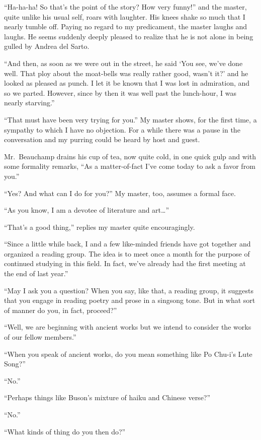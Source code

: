 \documentclass[12pt, openright]{book}
\begin{document}
``Ha-ha-ha! So that's the point of the story? How very funny!'' and the
master, quite unlike his usual self, roars with laughter. His knees
shake so much that I nearly tumble off. Paying no regard to my
predicament, the master laughs and laughs. He seems suddenly deeply
pleased to realize that he is not alone in being gulled by Andrea del
Sarto.

``And then, as soon as we were out in the street, he said `You see,
we've done well. That ploy about the moat-bells was really rather good,
wasn't it?' and he looked as pleased as punch. I let it be known that I
was lost in admiration, and so we parted. However, since by then it was
well past the lunch-hour, I was nearly starving.''

``That must have been very trying for you.'' My master shows, for the
first time, a sympathy to which I have no objection. For a while there
was a pause in the conversation and my purring could be heard by host
and guest.

Mr.~Beauchamp drains his cup of tea, now quite cold, in one quick gulp
and with some formality remarks, ``As a matter-of-fact I've come today
to ask a favor from you.''

``Yes? And what can I do for you?'' My master, too, assumes a formal
face.

``As you know, I am a devotee of literature and art\ldots{}''

``That's a good thing,'' replies my master quite encouragingly.

``Since a little while back, I and a few like-minded friends have got
together and organized a reading group. The idea is to meet once a month
for the purpose of continued studying in this field. In fact, we've
already had the first meeting at the end of last year.''

``May I ask you a question? When you say, like that, a reading group, it
suggests that you engage in reading poetry and prose in a singsong tone.
But in what sort of manner do you, in fact, proceed?''

``Well, we are beginning with ancient works but we intend to consider
the works of our fellow members.''

``When you speak of ancient works, do you mean something like Po Chu-i's
Lute Song?''

``No.''

``Perhaps things like Buson's mixture of haiku and Chinese verse?''

``No.''

``What kinds of thing do you then do?''
\end{document}
